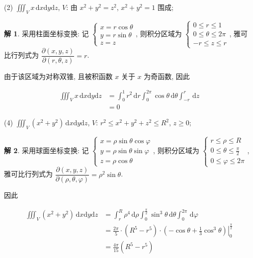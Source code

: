 \documentclass[a4paper,12pt]{article}
\theoremstyle{definition}
\newtheorem*{sol}{解}
\begin{document}
(2) $\displaystyle\iiint_V x \, \mathrm{d}x\mathrm{d}y\mathrm{d}z$, $V$: 由 $x^2+y^2=z^2$, $x^2+y^2=1$ 围成;
\begin{sol}
    采用柱面坐标变换: 记 $\begin{cases}
            x=r\cos\theta \\
            y=r\sin\theta \\
            z=z
        \end{cases}$, 则积分区域为 $\begin{cases}
            0\leq r\leq 1         \\
            0\leq \theta\leq 2\pi \\
            -r\leq z\leq r
        \end{cases}$, 雅可比行列式为 $\dfrac{\partial(x,y,z)}{\partial(r,\theta,z)}=r$.

    由于该区域为对称双锥, 且被积函数 $x$ 关于 $x$ 为奇函数, 因此

    \begin{align*}
        \iiint_V x \, \mathrm{d}x\mathrm{d}y\mathrm{d}z
         & =\int_0^1r^2\,\mathrm{d}r\int_0^{2\pi}\cos\theta\,\mathrm{d}\theta\int_{-r}^r \,\mathrm{d}z \\
         & =0
    \end{align*}
\end{sol}
(4) $\displaystyle\iiint_V (x^2+y^2) \, \mathrm{d}x\mathrm{d}y\mathrm{d}z$, $V$: $r^2 \leq x^2+y^2+z^2 \leq R^2$, $z \geq 0$;
\begin{sol}
    采用球面坐标变换: 记 $\begin{cases}
            x=\rho\sin\theta\cos\varphi \\
            y=\rho\sin\theta\sin\varphi \\
            z=\rho\cos\theta
        \end{cases}$, 则积分区域为 $\begin{cases}
            r\leq \rho\leq R               \\
            0\leq \theta\leq \frac{\pi}{2} \\
            0\leq \varphi\leq 2\pi
        \end{cases}$, 雅可比行列式为 $\dfrac{\partial(x,y,z)}{\partial(\rho,\theta,\varphi)}=\rho^2\sin\theta$.

    因此

    \begin{align*}
        \iiint_V (x^2+y^2) \, \mathrm{d}x\mathrm{d}y\mathrm{d}z
         & =\int_r^R \rho^4\,\mathrm{d}\rho\int_0^{\frac{\pi}{2}}\sin^3\theta\,\mathrm{d}\theta\int_0^{2\pi}\,\mathrm{d}\varphi \\
         & =\frac{2\pi}{5}\cdot(R^5-r^5)\cdot\left.\left(-\cos\theta+\frac{1}{3}\cos^3\theta\right)\right|_0^{\frac{\pi}{2}}    \\
         & =\frac{4\pi}{15}(R^5-r^5)
    \end{align*}
\end{sol}
\end{document}
